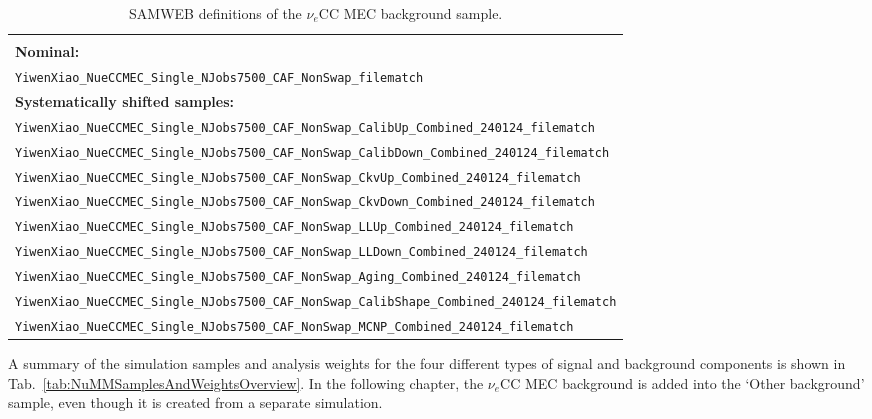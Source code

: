 \begin{table}[!ht]
\centering
\caption{SAMWEB definitions of the $\nu_e$CC MEC background sample.}
\begin{tabular}{p{\textwidth}}
\hline\hline\\[-2mm]
\textbf{Nominal:}\\
\texttt{YiwenXiao\_NueCCMEC\_Single\_NJobs7500\_CAF\_NonSwap\_filematch}\\[2mm]
\textbf{Systematically shifted samples:}\\
\texttt{YiwenXiao\_NueCCMEC\_Single\_NJobs7500\_CAF\_NonSwap\_CalibUp\_Combined\_240124\_filematch}\\[2mm]
\texttt{YiwenXiao\_NueCCMEC\_Single\_NJobs7500\_CAF\_NonSwap\_CalibDown\_Combined\_240124\_filematch}\\[2mm]
\texttt{YiwenXiao\_NueCCMEC\_Single\_NJobs7500\_CAF\_NonSwap\_CkvUp\_Combined\_240124\_filematch}\\[2mm]
\texttt{YiwenXiao\_NueCCMEC\_Single\_NJobs7500\_CAF\_NonSwap\_CkvDown\_Combined\_240124\_filematch}\\[2mm]
\texttt{YiwenXiao\_NueCCMEC\_Single\_NJobs7500\_CAF\_NonSwap\_LLUp\_Combined\_240124\_filematch}\\[2mm]
\texttt{YiwenXiao\_NueCCMEC\_Single\_NJobs7500\_CAF\_NonSwap\_LLDown\_Combined\_240124\_filematch}\\[2mm]
\texttt{YiwenXiao\_NueCCMEC\_Single\_NJobs7500\_CAF\_NonSwap\_Aging\_Combined\_240124\_filematch}\\[2mm]
\texttt{YiwenXiao\_NueCCMEC\_Single\_NJobs7500\_CAF\_NonSwap\_CalibShape\_Combined\_240124\_filematch}\\[2mm]
\texttt{YiwenXiao\_NueCCMEC\_Single\_NJobs7500\_CAF\_NonSwap\_MCNP\_Combined\_240124\_filematch}\\[2mm]
\hline\hline
\end{tabular}
\label{tab:NueCCMECDefinitions}
\end{table}


A summary of the simulation samples and analysis weights for the four different types of signal and background components is shown in Tab.~\ref{tab:NuMMSamplesAndWeightsOverview}. In the following chapter, the $\nu_e$\gls{CC} \gls{MEC} background is added into the `Other background' sample, even though it is created from a separate simulation.

